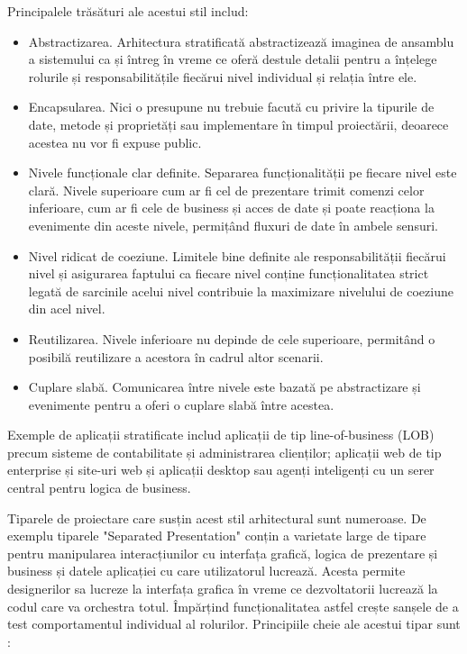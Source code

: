 \documentclass[12pt, a4paper, oneside, romanian]{teza-upb}
\begin{document}
Principalele trăsături ale acestui stil includ:
\begin{itemize}
 \item Abstractizarea. Arhitectura stratificată abstractizează imaginea de ansamblu a sistemului ca și întreg în vreme ce oferă destule detalii pentru a înțelege rolurile și responsabilitățile fiecărui nivel individual și relația între ele.
 \item Encapsularea. Nici o presupune nu trebuie facută cu privire la tipurile de date, metode și proprietăți sau implementare în timpul proiectării, deoarece acestea nu vor fi expuse public.
 \item Nivele funcționale clar definite. Separarea funcționalității pe fiecare nivel este clară. Nivele superioare cum ar fi cel de prezentare trimit comenzi celor inferioare, cum ar fi cele de business și acces de date și poate reacționa la evenimente din aceste nivele, permițând fluxuri de date în ambele sensuri.
 \item Nivel ridicat de coeziune. Limitele bine definite ale responsabilității fiecărui nivel și asigurarea faptului ca fiecare nivel conține funcționalitatea strict legată de sarcinile acelui nivel contribuie  la maximizare nivelului de coeziune din acel nivel.
 \item Reutilizarea. Nivele inferioare nu depinde de cele superioare, permitând o posibilă reutilizare a acestora în cadrul altor scenarii.
 \item Cuplare slabă. Comunicarea între nivele este bazată pe abstractizare și evenimente pentru a oferi o cuplare slabă între acestea.
\end{itemize}

Exemple de aplicații stratificate includ aplicații de tip line-of-business (LOB) precum sisteme de contabilitate și administrarea clienților; aplicații web de tip enterprise și site-uri web și aplicații desktop sau agenți inteligenți cu un serer central pentru logica de business.

Tiparele de proiectare care susțin acest stil arhitectural sunt numeroase. De exemplu  tiparele "Separated Presentation" conțin a varietate large de tipare pentru manipularea interacțiunilor cu interfața grafică, logica de prezentare și business și datele aplicației cu care utilizatorul lucrează. Acesta permite designerilor sa lucreze la interfața grafica în vreme ce dezvoltatorii lucrează la codul care va orchestra totul. Împărțind funcționalitatea astfel crește sanșele de a test comportamentul individual al rolurilor. Principiile cheie ale acestui tipar sunt :
\end{document}
